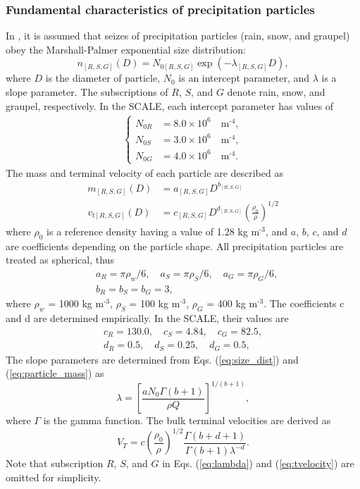 \subsubsection{Fundamental characteristics of precipitation particles}
In \citet{tomita_2008}, it is assumed that seizes of precipitation particles (rain, snow, and graupel) obey the Marshall-Palmer exponential size distribution:
\begin{equation}
  n_{[R,S,G]}(D) = N_{0[R,S,G]}\exp(-\lambda_{[R,S,G]}D)\label{eq:size_dist},
\end{equation}
where $D$ is the diameter of particle, $N_{0}$ is an intercept parameter, and $\lambda$ is a slope parameter. The subscriptions of $R$, $S$, and $G$ denote rain, snow, and graupel, respectively. In the SCALE, each intercept parameter has values of
\begin{align}
\begin{cases}
  N_{0R}&=8.0\times 10^{6}\quad\text{m}^{\text{-4}}, \\ 
  N_{0S}&=3.0\times 10^{6}\quad\text{m}^{\text{-4}}, \\ 
  N_{0G}&=4.0\times 10^{6}\quad\text{m}^{\text{-4}}.
\end{cases}
\end{align}
The mass and terminal velocity of each particle are described as
\begin{align}
  m_{[R,S,G]}(D) &= a_{[R,S,G]}D^{b_{[R,S,G]}}\label{eq:particle_mass} \\
  v_{t[R,S,G]}(D) &= c_{[R,S,G]}D^{d_{[R,S,G]}}\left(\frac{\rho_{0}}{\rho}\right)^{1/2}
\end{align}
where $\rho_{0}$ is a reference density having a value of 1.28 kg $\text{m}^{\text{-3}}$, and $a$, $b$, $c$, and $d$ are coefficients depending on the particle shape. All precipitation particles are treated as spherical, thus
\begin{align}
  &a_{R}=\pi \rho_{w}/6,\quad a_{S}=\pi \rho_{S}/6,\quad a_{G}=\pi \rho_{G}/6, \\
  &b_{R}=b_{S}=b_{G}=3,
\end{align}
where $\rho_{w}$ = 1000 kg $\text{m}^{\text{-3}}$, $\rho_{S}$ = 100 kg $\text{m}^{\text{-3}}$, $\rho_{G}$ = 400 kg $\text{m}^{\text{-3}}$. The coefficients c and d are determined empirically. In the SCALE, their values are
\begin{align}
  c_{R}=130.0,\quad c_{S}=4.84,\quad c_{G}=82.5, \\
  d_{R}=0.5,\quad d_{S}=0.25,\quad d_{G}=0.5,
\end{align}
The slope parameters are determined from Eqs. (\ref{eq:size_dist}) and (\ref{eq:particle_mass}) as
\begin{equation}
  \lambda=\left[\frac{aN_{0}\Gamma (b+1)}{\rho Q}\right]^{1/(b+1)}\label{eq:lambda},
\end{equation}
where $\Gamma$ is the gamma function. The bulk terminal velocities are derived as
\begin{equation}
  V_{T}=c\left(\frac{\rho_{0}}{\rho}\right)^{1/2}\frac{\Gamma(b+d+1)}{\Gamma(b+1)\lambda^{-d}}\label{eq:tvelocity}.
\end{equation}
Note that subscription $R$, $S$, and $G$ in Eqs. (\ref{eq:lambda}) and (\ref{eq:tvelocity}) are omitted for simplicity.

